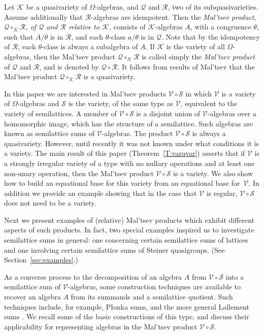 \documentclass{birkau}
\def\Om{\Omega}
\newcommand{\mc}{\mathcal}
\newcommand{\mcV}{\mathcal{V}}
\newcommand{\mcK}{\mathcal{K}}
\newcommand{\mcS}{\mathcal{S}}
\theoremstyle{plain}
\theoremstyle{definition}
\numberwithin{equation}{section}
\begin{document}
\maketitle

Let $\mc{K}$ be a quasivariety of $\Om$-algebras, and $\mc{Q}$ and $\mc{R}$, two of its
subquasivarieties. Assume additionally that $\mc{R}$-algebras are idempotent. Then the
\emph{Mal'tsev product, $\mc{Q} \circ_{\mc{K}} \mc{R}$, of $\mc{Q}$ and $\mc{R}$ relative
  to $\mc{K}$,} consists of $\mc{K}$-algebras $A$, with a congruence $\theta$, such that
$A/\theta$ is in $\mc{R}$, and each $\theta$-class $a/\theta$ is in $\mc{Q}$. Note that by
the idempotency of $\mc{R}$, each $\theta$-class is always a subalgebra of $A$. If
$\mc{K}$ is the variety of all $\Om$-algebras, then the Mal'tsev product
$\mc{Q} \circ_{\mcK} \mc{R}$ is called simply the \emph{Mal'tsev product} of $\mc{Q}$ and
$\mc{R}$, and is denoted by $\mc{Q} \circ \mc{R}$. It follows from results of  Mal'tsev
\cite{M67} that the  Mal'tsev product $\mc{Q} \circ_{\mc{K}} \mc{R}$ is a quasivariety.

In this paper we are interested in Mal'tsev products $\mcV \circ \mcS$ in which $\mcV$ is
a variety of $\Om$-algebras and $\mcS$ is the variety, of the same type as $\mcV$,
equivalent to the variety of semilattices.  A member of $\mcV \circ \mcS$ is a disjoint
union of $\mcV$-algebras over a homomorphic image, which has the structure of a
semilattice.  Such algebras are known as
semilattice sums of $\mcV$-algebras. The product $\mcV \circ \mcS$ is always a
quasivariety. However, until recently it was not known under what conditions it is a
variety. The main result of this paper (Theorem~\ref{T:varqvar}) asserts that if $\mcV$ is a
strongly irregular variety of a type with no nullary operations and at least one
non-unary operation, then the Mal'tsev product
$\mcV \circ \mcS$ is a variety. We also show how to build an equational base for this
variety from an equational base for~$\mcV$. In addition we provide an example showing that in the
case that $\mcV$ is  regular, $\mcV\circ \mcS$ does not need to be a variety.

Next we present examples of  (relative) Mal'tsev products which exhibit different aspects
of such products. In fact, two special examples inspired us to investigate semilattice
sums in general: one concerning certain semilattice sums of lattices and one involving
certain semilattice sums of Steiner quasigroups. (See Section~\ref{sec:examples}.)


As a converse process to the decomposition of an algebra $A$ from $\mcV \circ \mcS$ into
a semilattice sum of $\mcV$-algebras, some construction techniques are available to
recover an algebra $A$ from its summands and a semilattice quotient. Such techniques
include, for example, P\l onka sums, and the more general Lallement sums
\cite[Ch.~4]{RS02}. We recall some of the basic constructions of this type, and discuss
their applicability for representing algebras in the Mal'tsev product $\mcV \circ \mcS$.
\end{document}
